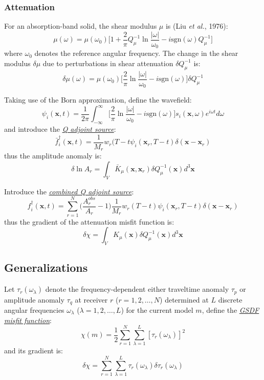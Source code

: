 \documentclass{article}
\newcommand{\mbf}[1]{\mathbf{#1}}
\newcommand{\mynem}[1]{\textsl{\uline{#1}}}
\newcommand{\myno}[1]{{\color{blue}#1}}
\newcommand{\etal}{\textit{et al.}}
\newcommand{\sgn}{\text{sgn}}
\begin{document}
\subsubsection{Attenuation}
For an absorption-band solid, the shear modulus $\mu$ is (Liu \etal, 1976):
\[ \mu(\omega)=\mu(\omega_0)\Big[1+\frac{2}{\pi}Q_\mu^{-1}\ln\frac{|\omega|}{\omega_0}-i\sgn(\omega)Q_\mu^{-1}\Big] \]
where $\omega_0$ denotes the reference angular frequency. The change in the shear modulus $\delta\mu$ due to perturbations in shear attenuation $\delta Q_\mu^{-1}$ is:
\[ \delta\mu(\omega)=\mu(\omega_0)\Big[\frac{2}{\pi}\ln\frac{|\omega|}{\omega_0}-i\sgn(\omega)\Big]\delta Q_\mu^{-1} \]\par
Taking use of the Born approximation, define the wavefield:
\[ \psi_i(\mbf x,t)=\frac{1}{2\pi}\int_{-\infty}^\infty\Big[\frac{2}{\pi}\ln\frac{|\omega|}{\omega_0}-i\sgn(\omega)\Big]s_i(\mbf x,\omega)e^{i\omega t}d\omega \]
and introduce the \mynem{Q adjoint source}:
\[ \bar f_i^\dagger(\mbf x,t)=\frac{1}{M_r}w_r(T-t\psi_i(\mbf x_r,T-t)\delta(\mbf x-\mbf x_r) \]
thus the amplitude anomaly is:
\[ \delta\ln A_r=\int_V\bar K_\mu(\mbf x,\mbf x_r)\delta Q_\mu^{-1}(\mbf x)d^3\mbf x \]\par
Introduce the \mynem{combined Q adjoint source}:
\[ f_i^\dagger(\mbf x,t)=\sum_{r=1}^N\Big(\frac{A_r^{obs}}{A_r}-1\Big)\frac{1}{M_r}w_r(T-t)\psi_i(\mbf x_r,T-t)\delta(\mbf x-\mbf x_r) \]
thus the gradient of the \myno{attenuation} misfit function is:
\[ \delta\chi=\int_VK_\mu(\mbf x)\delta Q_\mu^{-1}(\mbf x)d^3\mbf x \]\par
\subsection{Generalizations}
Let $\tau_r(\omega_\lambda)$ denote the frequency-dependent either traveltime anomaly $\tau_p$ or amplitude anomaly $\tau_q$ at receiver $r$ ($r=1,2,\ldots,N$) determined at $L$ discrete angular frequencies $\omega_\lambda$ ($\lambda=1,2,\ldots,L$) for the current model $m$, define the \mynem{GSDF misfit function}:
\[ \chi(m)=\frac{1}{2}\sum_{r=1}^N\sum_{\lambda=1}^L[\tau_r(\omega_\lambda)]^2 \]
and its gradient is:
\[ \delta\chi=\sum_{r=1}^N\sum_{\lambda=1}^L\tau_r(\omega_\lambda)\delta\tau_r(\omega_\lambda) \]
\end{document}
